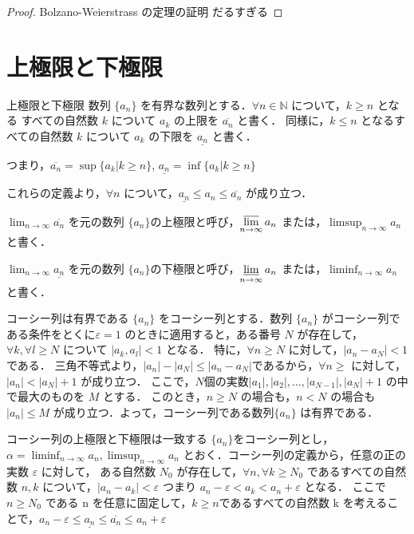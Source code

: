 \documentclass[a4paper]{ltjsarticle}
\newcommand{\seq}[1]{\{#1\}}
\begin{document}
\begin{proof}{Bolzano-Weierstrass の定理の証明}{}
だるすぎる
\end{proof}

\section{上極限と下極限}

\begin{tcb}{上極限と下極限}{}
数列 $\{a_n\}$ を有界な数列とする．$\forall n \in \mathbb{N}$ について，$k \geq n$ となる すべての自然数 $k$ について $a_k$ の上限を $\overline{a_n}$ と書く． 
同様に，$k \leq n$ となるすべての自然数 $k$ について $a_k$ の下限を $\underline{a_n}$ と書く．

つまり，$\overline{a_n} = {\sup\seq{a_k | k \geq n}}$, $\underline{a_n} ={\inf\seq{a_k | k \geq n}}$ 

これらの定義より，$\forall n$ について，$\underline{a_n} \leq a_n \leq \overline{a_n}$ が成り立つ．

$\displaystyle \lim_{n \to \infty} \overline{a_n}$ を元の数列 $\{a_n\} $の上極限と呼び，$\displaystyle \varlimsup_{n \to \infty} a_n$ または，$\displaystyle \limsup_{n \to \infty} a_n$ と書く．

$\displaystyle \lim_{n \to \infty} \underline{a_n}$ を元の数列 $\{a_n\} $の下極限と呼び，$\displaystyle \varliminf_{n \to \infty} a_n$ または，$\displaystyle \liminf_{n \to \infty} a_n$ と書く．

\end{tcb}

\begin{lemma}{コーシー列は有界である}{}
$\{a_n\}$ をコーシー列とする．数列 $\{a_n\}$ がコーシー列である条件をとくに$\varepsilon = 1$ のときに適用すると，ある番号 $N$ が存在して，$\forall k, \forall l \geq N$ について $|a_k, a_l| < 1$ となる．
特に，$\forall n \geq N$ に対して，$|a_n - a_N| < 1$ である．
三角不等式より，$|a_n| - |a_N| \leq |a_n - a_N|$であるから，$\forall n \geq$ に対して，$|a_n| < |a_N| + 1$ が成り立つ．
ここで，$N 個の実数 |a_1|, |a_2|, \ldots, |a_{N-1}|, |a_N| + 1$ の中で最大のものを $M$ とする．
このとき，$n \geq N$ の場合も，$n < N$ の場合も $|a_n| \leq M$ が成り立つ．よって，コーシー列である数列$\{a_n\}$ は有界である．
\end{lemma}

\begin{lemma}{コーシー列の上極限と下極限は一致する}{}
$\{a_n\}$をコーシー列とし，$\alpha = \displaystyle \liminf_{n \to \infty} a_n, \limsup_{n \to \infty} a_n$ とおく．コーシー列の定義から，任意の正の実数 $\varepsilon$ に対して，
ある自然数 $N_0$ が存在して，$\forall n, \forall k \geq N_0$ であるすべての自然数 $n, k$ について，$|a_n - a_k| < \varepsilon$ つまり $a_n - \varepsilon < a_k < a_n+ \varepsilon$ となる．
ここで $n \geq N_0$ である n を任意に固定して，$k \geq n $であるすべての自然数 k を考えることで，$a_n - \varepsilon \leq \underline{a_n} \leq \overline{a_n} \leq a_n + \varepsilon$

\end{lemma}
\end{document}
